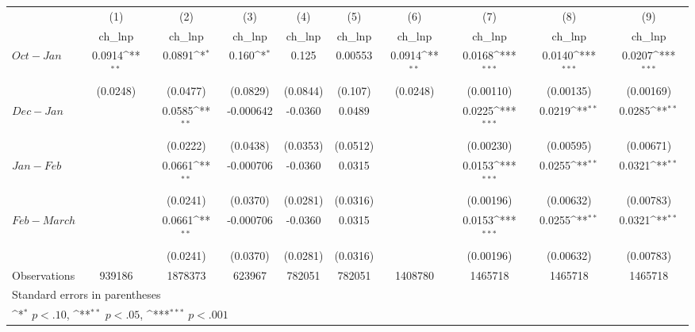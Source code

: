 {
\def\sym#1{\ifmmode^{#1}\else\(^{#1}\)\fi}
\begin{tabular}{l*{9}{c}}
\hline\hline
                    &\multicolumn{1}{c}{(1)}&\multicolumn{1}{c}{(2)}&\multicolumn{1}{c}{(3)}&\multicolumn{1}{c}{(4)}&\multicolumn{1}{c}{(5)}&\multicolumn{1}{c}{(6)}&\multicolumn{1}{c}{(7)}&\multicolumn{1}{c}{(8)}&\multicolumn{1}{c}{(9)}\\
                    &\multicolumn{1}{c}{ch\_lnp}&\multicolumn{1}{c}{ch\_lnp}&\multicolumn{1}{c}{ch\_lnp}&\multicolumn{1}{c}{ch\_lnp}&\multicolumn{1}{c}{ch\_lnp}&\multicolumn{1}{c}{ch\_lnp}&\multicolumn{1}{c}{ch\_lnp}&\multicolumn{1}{c}{ch\_lnp}&\multicolumn{1}{c}{ch\_lnp}\\
\hline
$ Oct - Jan $ &       0.0914\sym{**} &      0.0891\sym{*}  &       0.160\sym{*}  &       0.125         &     0.00553         &      0.0914\sym{**} &      0.0168\sym{***}&      0.0140\sym{***}&      0.0207\sym{***}\\
                    &    (0.0248)         &    (0.0477)         &    (0.0829)         &    (0.0844)         &     (0.107)         &    (0.0248)         &   (0.00110)         &   (0.00135)         &   (0.00169)         \\
[1em]
$Dec - Jan $&                     &      0.0585\sym{**} &   -0.000642         &     -0.0360         &      0.0489         &                     &      0.0225\sym{***}&      0.0219\sym{**} &      0.0285\sym{**} \\
                    &                     &    (0.0222)         &    (0.0438)         &    (0.0353)         &    (0.0512)         &                     &   (0.00230)         &   (0.00595)         &   (0.00671)         \\
[1em]
$Jan - Feb$&                     &      0.0661\sym{**} &   -0.000706         &     -0.0360         &      0.0315         &                     &      0.0153\sym{***}&      0.0255\sym{**} &      0.0321\sym{**} \\
                    &                     &    (0.0241)         &    (0.0370)         &    (0.0281)         &    (0.0316)         &                     &   (0.00196)         &   (0.00632)         &   (0.00783)         \\
      $Feb - March $ &                     &      0.0661\sym{**} &   -0.000706         &     -0.0360         &      0.0315         &                     &      0.0153\sym{***}&      0.0255\sym{**} &      0.0321\sym{**} \\
                    &                     &    (0.0241)         &    (0.0370)         &    (0.0281)         &    (0.0316)         &                     &   (0.00196)         &   (0.00632)         &   (0.00783)         \\
\hline
Observations        &      939186         &     1878373         &      623967         &      782051         &      782051         &     1408780         &     1465718         &     1465718         &     1465718         \\
\hline\hline
\multicolumn{10}{l}{\footnotesize Standard errors in parentheses}\\
\multicolumn{10}{l}{\footnotesize \sym{*} \(p<.10\), \sym{**} \(p<.05\), \sym{***} \(p<.001\)}\\
\end{tabular}
}
